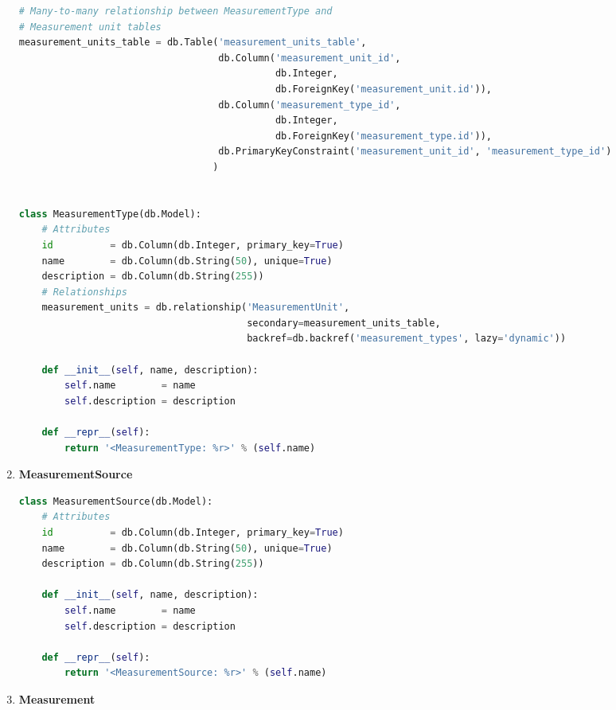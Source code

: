\begin{enumerate}
\begin{lstlisting}[language=Python]
# Many-to-many relationship between MeasurementType and 
# Measurement unit tables
measurement_units_table = db.Table('measurement_units_table',
                                   db.Column('measurement_unit_id',
                                             db.Integer,
                                             db.ForeignKey('measurement_unit.id')),
                                   db.Column('measurement_type_id',
                                             db.Integer,
                                             db.ForeignKey('measurement_type.id')),
                                   db.PrimaryKeyConstraint('measurement_unit_id', 'measurement_type_id')
                                  )


class MeasurementType(db.Model):
    # Attributes
    id          = db.Column(db.Integer, primary_key=True)
    name        = db.Column(db.String(50), unique=True)
    description = db.Column(db.String(255))
    # Relationships
    measurement_units = db.relationship('MeasurementUnit',
                                        secondary=measurement_units_table,
                                        backref=db.backref('measurement_types', lazy='dynamic'))

    def __init__(self, name, description):
        self.name        = name
        self.description = description

    def __repr__(self):
        return '<MeasurementType: %r>' % (self.name)
\end{lstlisting}
	
\item \textbf{MeasurementSource}
	
\begin{lstlisting}[language=Python]
class MeasurementSource(db.Model):
    # Attributes
    id          = db.Column(db.Integer, primary_key=True)
    name        = db.Column(db.String(50), unique=True)
    description = db.Column(db.String(255))

    def __init__(self, name, description):
        self.name        = name
        self.description = description

    def __repr__(self):
        return '<MeasurementSource: %r>' % (self.name)
\end{lstlisting}
	
\item \textbf{Measurement}
	

\end{enumerate}
